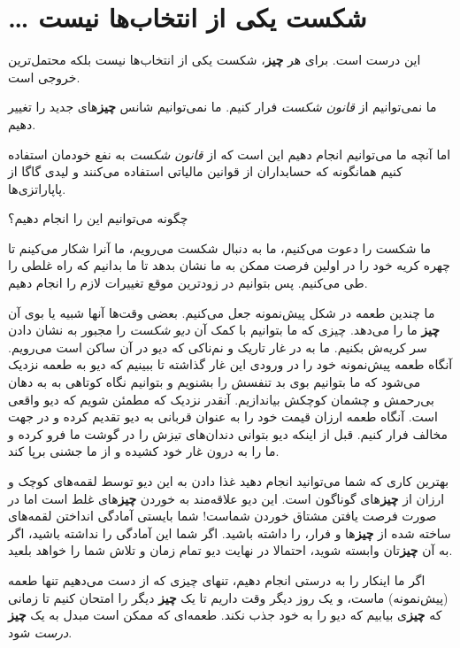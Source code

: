 \section{\ldots{} شکست یکی از انتخاب‌ها
نیست}\label{ux634ux6a9ux633ux62a-ux6ccux6a9ux6cc-ux627ux632-ux627ux646ux62aux62eux627ux628ux647ux627-ux646ux6ccux633ux62a}

این درست است. برای هر \textbf{چیز}، شکست یکی از انتخاب‌ها نیست بلکه
محتمل‌ترین خروجی است.

ما نمی‌توانیم از \emph{قانون شکست} فرار کنیم. ما نمی‌توانیم شانس
\textbf{چیز}های جدید را تغییر دهیم.

اما آنچه ما می‌توانیم انجام دهیم این است که از \emph{قانون شکست} به نفع
خودمان استفاده کنیم همانگونه که حسابداران از قوانین مالیاتی استفاده
می‌کنند و لیدی گاگا از پاپاراتزی‌ها.

چگونه می‌توانیم این را انجام دهیم؟

ما شکست را دعوت می‌کنیم، ما به دنبال شکست می‌رویم، ما آنرا شکار می‌کینم
تا چهره کریه خود را در اولین فرصت ممکن به ما نشان بدهد تا ما بدانیم که
راه غلطی را طی می‌کنیم. پس بتوانیم در زودترین موقع تغییرات لازم را انجام
دهیم.

ما چندین طعمه در شکل پیش‌نمونه جعل می‌کنیم. بعضی وقت‌ها آنها شبیه یا بوی
آن \textbf{چیز} ما را می‌دهد. چیزی که ما بتوانیم با کمک آن \emph{دیو
شکست} را مجبور به نشان دادن سر کریه‌ش بکنیم. ما به در غار تاریک و
نم‌ناکی که دیو در آن ساکن است می‌رویم. آنگاه طعمه پیش‌نمونه خود را در
ورودی این غار گذاشته تا ببینیم که دیو به طعمه نزدیک می‌شود که ما بتوانیم
بوی بد تنفسش را بشنویم و بتوانیم نگاه کوتاهی به به دهان بی‌رحمش و چشمان
کوچکش بیاندازیم. آنقدر نزدیک که مطمئن شویم که دیو واقعی است. آنگاه طعمه
ارزان قیمت خود را به عنوان قربانی به دیو تقدیم کرده و در جهت مخالف فرار
کنیم. قبل از اینکه دیو بتوانی دندان‌های تیزش را در گوشت ما فرو کرده و ما
را به درون غار خود کشیده و از ما جشنی برپا کند.

بهترین کاری که شما می‌توانید انجام دهید غذا دادن به این دیو توسط
لقمه‌های کوچک و ارزان از \textbf{چیز}های گوناگون است. این دیو علاقه‌مند
به خوردن \textbf{چیز}های غلط است اما در صورت فرصت یافتن مشتاق خوردن
شماست! شما بایستی آمادگی انداختن لقمه‌های ساخته شده از \textbf{چیز}ها و
فرار، را داشته باشید. اگر شما این آمادگی را نداشته باشید، اگر به آن
\textbf{چیز}تان وابسته شوید، احتمالا در نهایت دیو تمام زمان و تلاش شما
را خواهد بلعید.

اگر ما اینکار را به درستی انجام دهیم، تنهای چیزی که از دست می‌دهیم تنها
طعمه (پیش‌نمونه) ماست، و یک روز دیگر وقت داریم تا یک \textbf{چیز} دیگر
را امتحان کنیم تا زمانی که \textbf{چیز}ی بیابیم که دیو را به خود جذب
نکند. طعمه‌ای که ممکن است مبدل به یک \textbf{چیز} \emph{درست} شود.

